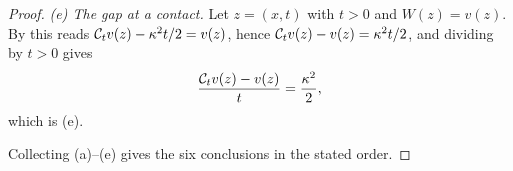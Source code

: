 \begin{proof}
\emph{(e) The gap at a contact.} Let $z=(x,t)$ with $t>0$ and $W(z)=v(z)$. By
 this reads $\mathcal{C}_tv(z)-\kappa^2t/2=v(z)$, hence
$\mathcal{C}_tv(z)-v(z)=\kappa^2t/2$, and dividing by $t>0$ gives
\[
  \frac{\mathcal{C}_tv(z)-v(z)}{t}=\frac{\kappa^2}{2},
\]
which is (e).

Collecting (a)--(e) gives the six conclusions in the stated order.
\end{proof}
